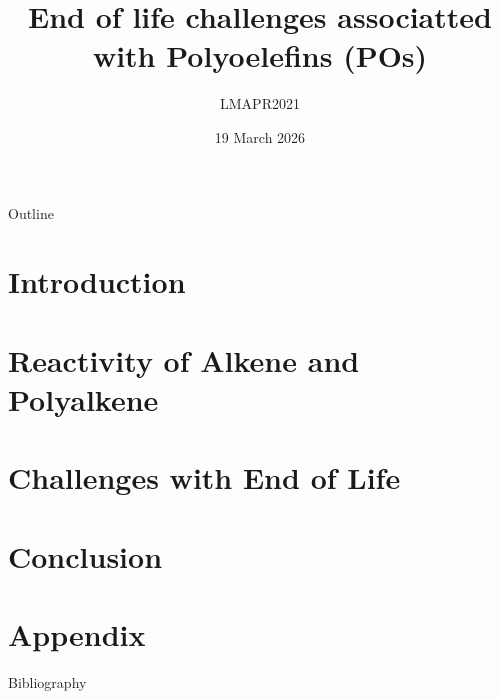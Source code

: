 \documentclass{Styles/beamer-style}
\author[F. Clinquart]{}
\title{End of life challenges associatted with Polyoelefins (POs)}
\subtitle{LMAPR2021}
\date{19 March 2026}
\begin{document}
\begin{frame}
    \titlepage
\end{frame}

\begin{frame}{Outline}
    \tableofcontents
\end{frame}

\section[Introduction]{Introduction}
    
\section[Reactivity]{Reactivity of Alkene and Polyalkene}
    
\section[End of Life]{Challenges with End of Life}
    
\section[Conclusion]{Conclusion}
    

\section{Appendix}
    \begin{frame}{Bibliography}
        \printbibliography[heading=none]
    \end{frame}
    



\end{document}
